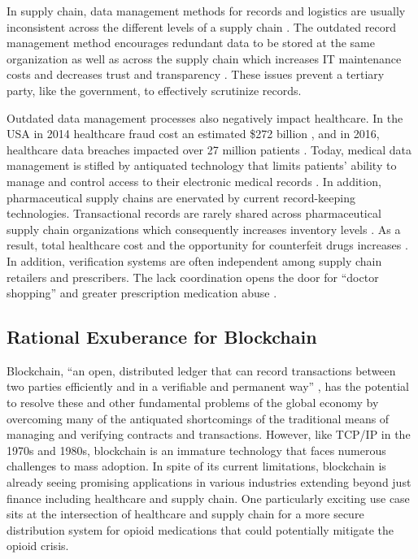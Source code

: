 \documentclass[sigconf]{acmart}
\begin{document}
In supply chain, data management methods for records and logistics are usually inconsistent across the different levels of a supply chain \cite{arbc4}. The outdated record management method encourages redundant data to be stored at the same organization as well as across the supply chain which increases IT maintenance costs and decreases trust and transparency \cite{arbc1}. These issues prevent a tertiary party, like the government, to effectively scrutinize records. 

Outdated data management processes also negatively impact healthcare. In the USA in 2014 healthcare fraud cost an estimated \$272 billion \cite{economist2014}, and in 2016, healthcare data breaches impacted over 27 million patients \cite{das2017}. Today, medical data management is stifled by antiquated technology that limits patients' ability to manage and control access to their electronic medical records \cite{ekblaw2016medrec}. 
In addition, pharmaceutical supply chains are enervated by current record-keeping technologies. Transactional records are rarely shared across pharmaceutical supply chain organizations which consequently increases inventory levels \cite{Nematollahi01}. As a result, total healthcare cost and the opportunity for counterfeit drugs increases \cite{Sahay01}. In addition, verification systems are often independent among supply chain retailers and prescribers. The lack coordination opens the door for ``doctor shopping'' and greater prescription medication abuse \cite{hitchingHealthcare}. 

\subsection{Rational Exuberance for Blockchain}
Blockchain, ``an open, distributed ledger that can record transactions between two parties efficiently and in a verifiable and permanent way'' \cite{hbr}, has the potential to resolve these and other fundamental problems of the global economy by overcoming many of the antiquated shortcomings of the traditional means of managing and verifying contracts and transactions. However, like TCP/IP in the 1970s and 1980s, blockchain is an immature technology that faces numerous challenges to mass adoption. In spite of its current limitations, blockchain is already seeing promising applications in various industries extending beyond just finance including healthcare and supply chain. One particularly exciting use case sits at the intersection of healthcare and supply chain for a more secure distribution system for opioid medications that could potentially mitigate the opioid crisis.
\end{document}
